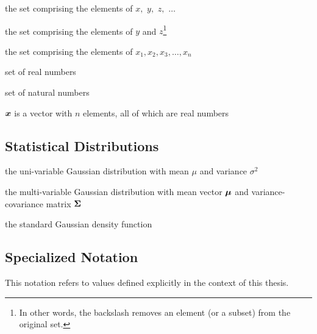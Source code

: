 \begin{description}[leftmargin=!, labelwidth=0.8in]
  \item[$\set{x, y, z, \ldots}$]  the set comprising the elements of $x,$ $y,$ $z,$ $\ldots$
  \item[$\set{x, y, z} \backslash x$]  the set comprising the elements of $y$ and $z$\footnote{In other words, the backslash removes an element (or a subset) from the original set.}
  \item[$\sett{x_i}{i = 1}{n}$]  the set comprising the elements of $x_1, x_2, x_3, \ldots, x_n$
  \item[$\RR$] set of real numbers
	\item[$\NN$] set of natural numbers
  \item[$\bs{x} \in \mathbb{R}^n$] $\boldsymbol{x}$ is a vector with $n$ elements, all of which are real numbers
\end{description}

\subsection{Statistical Distributions}
\begin{description}[leftmargin=!, labelwidth=0.8in]
  \item[$\mathcal{N} \left( \mu, \sigma^2 \right)$] the uni-variable Gaussian distribution with mean $\mu$ and variance $\sigma^2$
  \item[$\mathcal{N} \left( \bs{\mu}, \bs{\Sigma} \right)$] the multi-variable Gaussian distribution with mean vector $\boldsymbol{\mu}$ and variance-covariance matrix $\boldsymbol{\Sigma}$
  \item[$\phi(x)$] the standard Gaussian density function
\end{description}

\subsection{Specialized Notation}
This notation refers to values defined explicitly in the context of this thesis.

